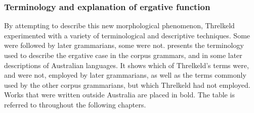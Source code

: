 \subsubsection{Terminology and explanation of ergative function}
\label{sec:key:3.3.7.1}

By attempting to describe this new morphological phenomenon, Threlkeld experimented with a variety of terminological and descriptive techniques. Some were followed by later grammarians, some were not.  presents the terminology used to describe the ergative case in the corpus grammars, and in some later descriptions of Australian languages. It shows which of Threlkeld’s terms were, and were not, employed by later grammarians, as well as the terms commonly used by the other corpus grammarians, but which Threlkeld had not employed. Works that were written outside Australia are placed in bold. The table is referred to throughout the following chapters.

